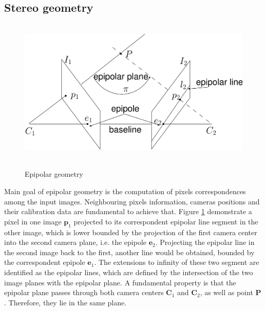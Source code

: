\subsection{Stereo geometry}
\label{subsection:stereogeom}
\begin{figure}[t]
	\begin{center}
		{\includegraphics[width=.8\textwidth, height=7cm, keepaspectratio]{images/epipolar-geometry}}
\caption{Epipolar geometry}
\label{fig:epipolargeom}
	\end{center}
\end{figure}
Main goal of epipolar geometry is the computation of pixels correspondences among the input images. 
Neighbouring pixels information, cameras positions and their calibration data are fundamental to achieve that.
Figure \ref{fig:epipolargeom} demonstrate a pixel in one image $\mathbf{p}_1$ projected to its correspondent epipolar line segment in the other image, which is lower bounded by the projection of the first camera center into the second camera plane, i.e. the epipole $\mathbf{e}_2$. 
Projecting the epipolar line in the second image back to the first, another line would be obtained, bounded by the correspondent epipole $\mathbf{e}_1$. 
The extensions to infinity of these two segment are identified as the epipolar lines, which are defined by the intersection of the two image planes with the epipolar plane.
A fundamental property is that the epipolar plane passes through both camera centers $\mathbf{C}_1$ and $\mathbf{C}_2$, as well as point $\mathbf{P}$. 
Therefore, they lie in the same plane. \\

